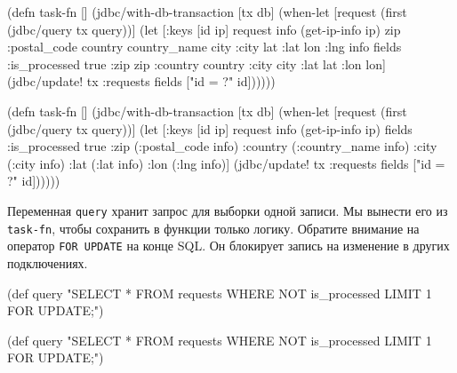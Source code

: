 \begin{english}
  \begin{clojure/lines}
(defn task-fn []
 (jdbc/with-db-transaction [tx db]
  (when-let [request
             (first
              (jdbc/query tx query))]
    (let [{:keys [id ip]} request
          info   (get-ip-info ip)
          {zip :postal_code
           country country_name
           city :city lat :lat
           lon :lng} info
          fields {:is_processed true
                  :zip zip
                  :country country
                  :city city
                  :lat lat
                  :lon lon}]
      (jdbc/update! tx :requests
        fields ["id = ?" id])))))
  \end{clojure/lines}
\end{english}

\else

\begin{english}
  \begin{clojure/lines}
(defn task-fn []
  (jdbc/with-db-transaction [tx db]
    (when-let [request (first (jdbc/query tx query))]
      (let [{:keys [id ip]} request
            info   (get-ip-info ip)
            fields {:is_processed true
                    :zip (:postal_code info)
                    :country (:country_name info)
                    :city (:city info)
                    :lat (:lat info)
                    :lon (:lng info)}]
        (jdbc/update! tx :requests
                      fields
                      ["id = ?" id])))))
  \end{clojure/lines}
\end{english}

\fi


Переменная \verb|query| хранит запрос для выборки одной записи. Мы вынести его
из \verb|task-fn|, чтобы сохранить в функции только логику. Обратите внимание на
оператор \verb|FOR UPDATE| на конце SQL. Он блокирует запись на изменение в
других подключениях.

\ifnarrow

\begin{english}
  \begin{clojure}
(def query
  "SELECT * FROM requests
   WHERE NOT is_processed
   LIMIT 1 FOR UPDATE;")
  \end{clojure}
\end{english}

\else

\begin{english}
  \begin{clojure}
(def query
  "SELECT * FROM requests WHERE NOT is_processed
   LIMIT 1 FOR UPDATE;")
  \end{clojure}
\end{english}

